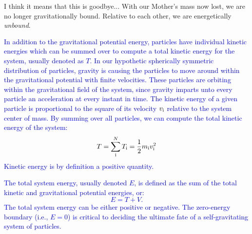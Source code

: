\documentclass[main.tex]{subfiles}
\begin{document}
\par \Sterope I think it means that this is goodbye...  With our Mother's mass now lost, we are no longer gravitationally bound.  Relative to each other, we are energetically \textit{unbound}.

\begin{tcolorbox}[sharp corners, colback=blue!30, colframe=blue!80!blue, title=Kinetic Energy]
\par \textcolor{blue} {In addition to the gravitational potential energy, particles have individual kinetic energies which can be summed over to compute a total kinetic energy for the system, usually denoted as $T$.  In our hypothetic spherically symmetric distribution of particles, gravity is causing the particles to move around within the gravitational potential with finite velocities.  These particles are orbiting within the gravitational field of the system, since gravity imparts unto every particle an acceleration at every instant in time.  The kinetic energy of a given particle is proportional to the square of its velocity $v_{\rm i}$ relative to the system center of mass.  By summing over all particles, we can compute the total kinetic energy of the system:
\begin{equation}
T = \sum_{\rm i}^{N} T_{\rm i} = \frac{1}{2}m_{\rm i}v_{\rm i}^2
\end{equation}
Kinetic energy is by definition a positive quantity.}  
\end{tcolorbox}

\begin{tcolorbox}[sharp corners, colback=blue!30, colframe=blue!80!blue, title=Total Energy]
\par \textcolor{blue} {The total system energy, usually denoted $E$, is defined as the sum of the total kinetic and gravitational potential energies, or:
\begin{equation}
E = T + V.
\end{equation}
The total system energy can be either positive or negative.  The zero-energy boundary (i.e., $E = 0$) is critical to deciding the ultimate fate of a self-gravitating system of particles.}  
\end{tcolorbox}
\end{document}
